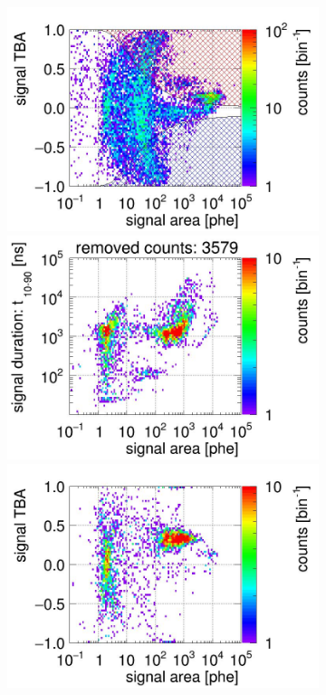 \begin{landscape}
\begin{figure}[!p]
\begin{subfigure}[t]{0.33\textwidth}
			\includegraphics[width=\figurewidth,clip,trim={0 98 0 40}]{Figures/GasTest/CutsValid/res64767/tbapa26Vecfig64767.jpg}
			\includegraphics[width=\figurewidth,clip,trim={0 98 0 10}]{Figures/GasTest/CutsValid/res64767/pdpaX26Vecfig64767.jpg}
			\includegraphics[width=\figurewidth,clip,trim={0 0 0 40}]{Figures/GasTest/CutsValid/res64767/tbapaX26Vecfig64767.jpg}

\end{subfigure}
\end{figure}
\end{landscape}
